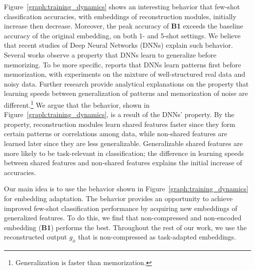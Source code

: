 \documentclass{article}
\begin{document}
Figure~\ref{graph:training_dynamics} shows an interesting behavior that few-shot classification accuracies, with embeddings of reconstruction modules, initially increase then decrease. Moreover, the peak accuracy of \textbf{B1} exceeds the baseline accuracy of the original embedding, on both 1- and 5-shot settings. 
We believe that recent studies of Deep Neural Networks (DNNs) explain such behavior. Several works \cite{ArpitL17, Lampinen19, stephenson21} observe a property that DNNs learn to generalize before memorizing. To be more specific, \citet{ArpitL17} reports that DNNs learn patterns first before memorization, with experiments on the mixture of well-structured real data and noisy data. Further research \citet{Lampinen19, stephenson21} provide analytical explanations on the property that learning speeds between generalization of patterns and memorization of noise are different.\footnote{Generalization is faster than memorization.} We argue that the behavior, shown in Figure~\ref{graph:training_dynamics}, is a result of the DNNs' property. By the property, reconstruction modules learn shared features faster since they form certain patterns or correlations among data, while non-shared features are learned later since they are less generalizable. Generalizable shared features are more likely to be task-relevant in classification; the difference in learning speeds between shared features and non-shared features explains the initial increase of accuracies.

Our main idea is to use the behavior shown in Figure~\ref{graph:training_dynamics} for embedding adaptation.
The behavior provides an opportunity to achieve improved few-shot classification performance by acquiring new embeddings of generalized features.
To do this, we find that non-compressed and non-encoded embedding (\textbf{B1}) performs the best. Throughout the rest of our work, we use the reconstructed output $g_\phi$ that is non-compressed as task-adapted embeddings.
\end{document}
